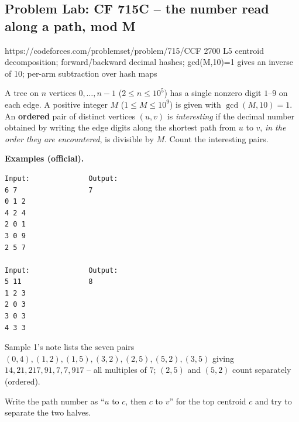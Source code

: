 \subsection{Problem Lab: CF 715C -- the number read along a path, mod M}

  {https://codeforces.com/problemset/problem/715/C}{CF 2700 L5}
  {centroid decomposition; forward/backward decimal hashes; gcd(M,10)=1 gives an inverse of 10; per-arm subtraction over hash maps}

\begin{problemstatement}
A tree on \(n\) vertices \(0,\dots,n-1\) (\(2\le n\le 10^5\)) has a single nonzero
digit \(1\)–\(9\) on each edge. A positive integer \(M\) (\(1\le M\le 10^9\)) is
given with \(\gcd(M,10)=1\). An \textbf{ordered} pair of distinct vertices
\((u,v)\) is \emph{interesting} if the decimal number obtained by writing the edge
digits along the shortest path from \(u\) to \(v\), \emph{in the order they are
encountered}, is divisible by \(M\). Count the interesting pairs.

\textbf{Examples (official).}
\begin{verbatim}
Input:              Output:
6 7                 7
0 1 2
4 2 4
2 0 1
3 0 9
2 5 7

Input:              Output:
5 11                8
1 2 3
2 0 3
3 0 3
4 3 3
\end{verbatim}
Sample 1's note lists the seven pairs
\((0,4),(1,2),(1,5),(3,2),(2,5),(5,2),(3,5)\) giving \(14,21,217,91,7,7,917\) --
all multiples of \(7\); \((2,5)\) and \((5,2)\) count separately (ordered).
\end{problemstatement}

\begin{attemptgate}
Write the path number as ``\(u\) to \(c\), then \(c\) to \(v\)'' for the top
centroid \(c\) and try to separate the two halves. 
\end{attemptgate}

